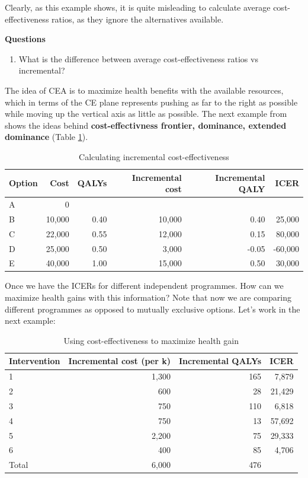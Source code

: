 \documentclass[
]{book}
\providecommand{\tightlist}{%
  \setlength{\itemsep}{0pt}\setlength{\parskip}{0pt}}
\begin{document}
Clearly, as this example shows, it is quite misleading to calculate average cost-effectiveness ratios, as they ignore the alternatives available.

\textbf{Questions}

\begin{enumerate}
\def\labelenumi{\arabic{enumi}.}
\tightlist
\item
  What is the difference between average cost-effectiveness ratios vs incremental?
\end{enumerate}

The idea of CEA is to maximize health benefits with the available resources, which in terms of the CE plane represents pushing as far to the right as possible while moving up the vertical axis as little as possible. The next example from \citet{gray2011applied} shows the ideas behind \textbf{cost-effectivness frontier, dominance, extended dominance} (Table \ref{tab:table2}).

\begin{table}

\caption{\label{tab:table2}Calculating incremental cost-effectiveness}
\centering
\begin{tabular}[t]{l|r|r|r|r|r}
\hline
Option & Cost & QALYs & Incremental cost & Incremental QALY & ICER\\
\hline
A & 0 &  &  &  & \\
\hline
B & 10,000 & 0.40 & 10,000 & 0.40 & 25,000\\
\hline
C & 22,000 & 0.55 & 12,000 & 0.15 & 80,000\\
\hline
D & 25,000 & 0.50 & 3,000 & -0.05 & -60,000\\
\hline
E & 40,000 & 1.00 & 15,000 & 0.50 & 30,000\\
\hline
\end{tabular}
\end{table}

Once we have the ICERs for different independent programmes. How can we maximize health gains with this information? Note that now we are comparing different programmes as opposed to mutually exclusive options. Let's work in the next example:

\begin{table}

\caption{\label{tab:table3}Using cost-effectiveness to maximize health gain}
\centering
\begin{tabular}[t]{l|r|r|r}
\hline
Intervention & Incremental cost (per k) & Incremental QALYs & ICER\\
\hline
1 & 1,300 & 165 & 7,879\\
\hline
2 & 600 & 28 & 21,429\\
\hline
3 & 750 & 110 & 6,818\\
\hline
4 & 750 & 13 & 57,692\\
\hline
5 & 2,200 & 75 & 29,333\\
\hline
6 & 400 & 85 & 4,706\\
\hline
Total & 6,000 & 476 & \\
\hline
\end{tabular}
\end{table}
\end{document}
